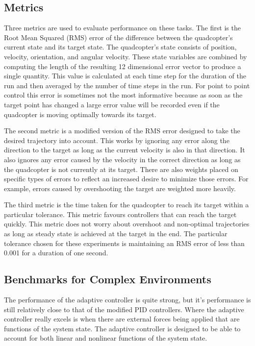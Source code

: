 \documentclass[letterpaper,12pt,titlepage,oneside,final]{book}
\begin{document}
\subsection{Metrics}

Three metrics are used to evaluate performance on these tasks. 
The first is the Root Mean Squared (RMS) error of the difference between the quadcopter's current state and its target state.
The quadcopter's state consists of position, velocity, orientation, and angular velocity.
These state variables are combined by computing the length of the resulting 12 dimensional error vector to produce a single quantity.
This value is calculated at each time step for the duration of the run and then averaged by the number of time steps in the run.
For point to point control this error is sometimes not the most informative because as soon as the target point has changed a large error value will be recorded even if the quadcopter is moving optimally towards its target.

The second metric is a modified version of the RMS error designed to take the desired trajectory into account.
This works by ignoring any error along the direction to the target as long as the current velocity is also in that direction.
It also ignores any error caused by the velocity in the correct direction as long as the quadcopter is not currently at its target.
There are also weights placed on specific types of errors to reflect an increased desire to minimize those errors.
For example, errors caused by overshooting the target are weighted more heavily.

The third metric is the time taken for the quadcopter to reach its target within a particular tolerance. 
This metric favours controllers that can reach the target quickly.
This metric does not worry about overshoot and non-optimal trajectories as long as steady state is achieved at the target in the end.
The particular tolerance chosen for these experiments is maintaining an RMS error of less than 0.001 for a duration of one second.



\subsection{Benchmarks for Complex Environments}

The performance of the adaptive controller is quite strong, but it’s performance is still relatively close to that of the modified PID controllers. 
Where the adaptive controller really excels is when there are external forces being applied that are functions of the system state. 
The adaptive controller is designed to be able to account for both linear and nonlinear functions of the system state.
\end{document}

